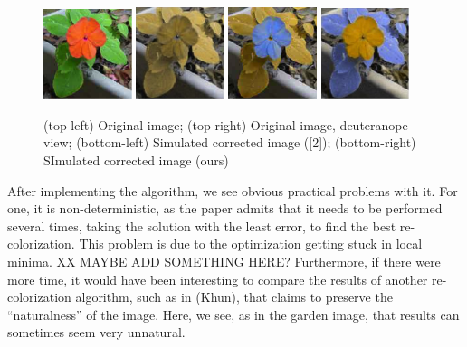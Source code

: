 \documentclass[10pt,twocolumn,letterpaper]{article}
\begin{document}
\begin{figure}[h]
  \includegraphics[width=0.23\textwidth]{flower1.png}
\includegraphics[width=0.23\textwidth]{flower2.png}
\includegraphics[width=0.23\textwidth]{flower3.png}
\includegraphics[width=0.23\textwidth]{flower4.png}
 \caption{(top-left) Original image; (top-right) Original image, deuteranope view; (bottom-left) Simulated corrected image ([2]); (bottom-right) SImulated corrected image (ours)}
  \label{fig:flower}
\end{figure}

	After implementing the algorithm, we see obvious practical problems with it. For one, it is non-deterministic, as the paper admits that it needs to be performed several times, taking the solution with the least error, to find the best re-colorization. This problem is due to the optimization getting stuck in local minima. XX MAYBE ADD SOMETHING HERE? Furthermore, if there were more time, it would have been interesting to compare the results of another re-colorization algorithm, such as in (Khun), that claims to preserve the “naturalness” of the image. Here, we see, as in the garden image, that results can sometimes seem very unnatural. 
\end{document}
